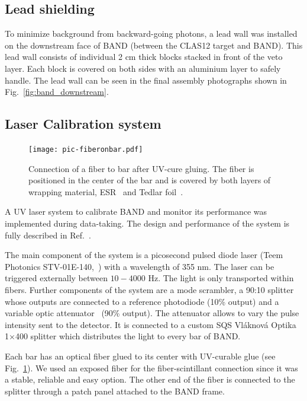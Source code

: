 \documentclass[3p,final,twocolumn]{elsarticle}
\begin{document}
\subsection{Lead shielding}
To minimize background from backward-going photons, a
lead wall was installed on the downstream face of BAND (between the CLAS12 target
and BAND). This lead wall consists of individual 2 \si{\centi\meter}
thick blocks stacked in front of the veto layer. Each block is covered
on both sides with an aluminium layer to safely handle. The
lead wall can be seen in the final assembly photographs shown in
Fig.~\ref{fig:band_downstream}.


\subsection{Laser Calibration system}
\label{sec:laserystem}
\begin{figure}[tb]
	\centering
		\texttt{[image: pic-fiberonbar.pdf]}
	\caption{Connection of a fiber to bar after UV-cure gluing. The fiber is positioned in the center of the bar and is covered by both layers of wrapping material, ESR~\cite{3MESR} and Tedlar\textregistered{} foil~\cite{tedlarfoil}.}
	\label{fig:pic-fiberonbar}
\end{figure} 
A UV laser system to calibrate BAND and monitor its
performance was implemented during data-taking. 
The design and performance of the system is fully 
described in Ref.~\cite{band-laser}. 

The main component of the system is a picosecond pulsed diode laser 
(Teem Photonics STV-01E-140,~\cite{teem_laser}) with a wavelength 
of 355 \si{\nano\meter}. The laser can be triggered externally between 
$10-4000$ \si{\hertz}. The light is only transported within fibers. Further components of the system are a mode scrambler, a 90:10 splitter whose outputs are connected to a reference photodiode (10\% output) and a variable optic attenuator~\cite{attenuator} (90\% output). The attenuator allows to vary the pulse intensity sent to the detector. It is connected to a custom SQS Vl\'aknov\'a Optika 1$\times$400 splitter which distributes the light to every bar of BAND. 

Each bar has an optical fiber glued to its center with UV-curable glue (see
Fig.~\ref{fig:pic-fiberonbar}). We used an exposed fiber for the fiber-scintillant connection since it was a stable, reliable and easy option. The other end of the fiber is connected to the splitter through a patch panel attached to the BAND frame. 
\end{document}
